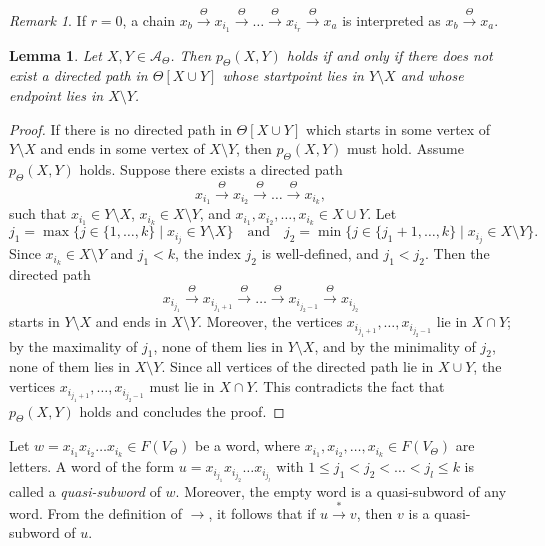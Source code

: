 \documentclass[pdflatex,sn-mathphys-num]{sn-jnl}
\newcommand{\tot}{\overset{\Theta}{\to}}
\newtheorem{lemma}[theorem]{Lemma}
\theoremstyle{definition}
\theoremstyle{remark}
\newtheorem{remark}[theorem]{Remark}
\begin{document}
\begin{remark}
   If $r = 0$, a chain $x_b \tot x_{i_1} \tot \dots \tot x_{i_r} \tot x_a$ is interpreted as $x_b \tot x_a$.
\end{remark}

\begin{lemma}
   Let $X, Y \in \mathcal{A}_{\Theta}$.
   Then $p_{\Theta}(X, Y)$ holds if and only if there does not exist a directed path in $\Theta[X \cup Y]$ whose startpoint lies in $Y \setminus X$ and whose endpoint lies in $X \setminus Y$.
\end{lemma}

\begin{proof}
   If there is no directed path in $\Theta[X \cup Y]$ which starts in some vertex of $Y \setminus X$ and ends in some vertex of $X \setminus Y$, then $p_{\Theta}(X, Y)$ must hold.
   Assume $p_{\Theta}(X, Y)$ holds.
   Suppose there exists a directed path
   \[
   x_{i_1} \tot x_{i_2} \tot \dots \tot x_{i_k},
   \]
   such that $x_{i_1} \in Y \setminus X$, $x_{i_k} \in X \setminus Y$, and $x_{i_1}, x_{i_2}, \dots, x_{i_k} \in X \cup Y$.
   Let
   \[
   j_1 = \max \{j \in \{1, \dots, k\} \mid x_{i_j} \in Y \setminus X \} \quad \text{and} \quad j_2 = \min \{j \in \{j_1 + 1, \dots, k\} \mid x_{i_j} \in X \setminus Y \}.
   \]
   Since $x_{i_k} \in X \setminus Y$ and $j_1 < k$, the index $j_2$ is well-defined, and $j_1 < j_2$.
   Then the directed path
   \[
   x_{i_{j_1}} \tot x_{i_{j_1 + 1}} \tot \dots \tot x_{i_{j_2 - 1}} \tot x_{i_{j_2}} 
   \]
   starts in $Y \setminus X$ and ends in $X \setminus Y$.
   Moreover, the vertices $x_{i_{j_1 + 1}}, \dots, x_{i_{j_2 - 1}}$ lie in $X \cap Y$; by the maximality of $j_1$, none of them lies in $Y \setminus X$, and by the minimality of $j_2$, none of them lies in $X \setminus Y$.
   Since all vertices of the directed path lie in $X \cup Y$, the vertices $x_{i_{j_1 + 1}}, \dots, x_{i_{j_2 - 1}}$ must lie in $X \cap Y$.
   This contradicts the fact that $p_{\Theta}(X, Y)$ holds and concludes the proof.
\end{proof}

Let $w = x_{i_1} x_{i_2} \dots x_{i_k} \in F(V_{\Theta})$ be a word, where $x_{i_1}, x_{i_2}, \dots, x_{i_k} \in F(V_{\Theta})$ are letters.
A word of the form $u = x_{i_{j_1}} x_{i_{j_2}} \dots x_{i_{j_l}}$ with $1 \leq j_1 < j_2 < \dots < j_l \leq k$ is called a \emph{quasi-subword} of $w$.
Moreover, the empty word is a quasi-subword of any word.
From the definition of $\to$, it follows that if $u \overset{*}{\to} v$, then $v$ is a quasi-subword of $u$.
\end{document}
